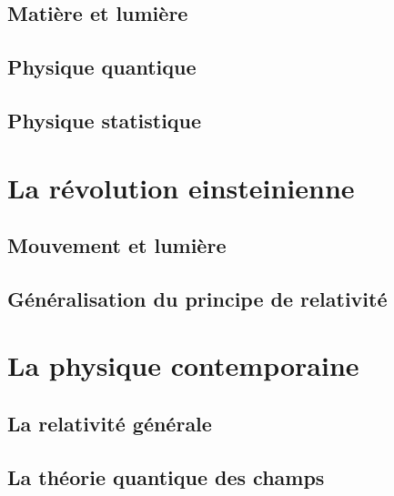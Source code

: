   \subsection{Matière et lumière}
  \subsection{Physique quantique}
  \subsection{Physique statistique}
\section{La révolution einsteinienne}
  \subsection{Mouvement et lumière}
  \subsection{Généralisation du principe de relativité}

\section{La physique contemporaine}
  \subsection{La relativité générale}
  \subsection{La théorie quantique des champs}




